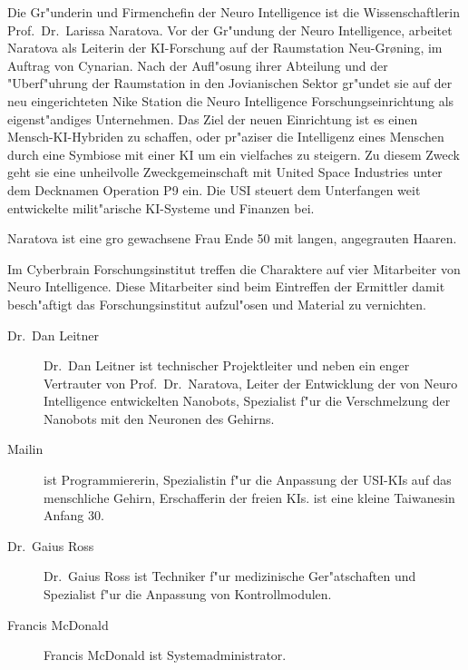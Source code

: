 \renewcommand{\ml}{\pinyin{Mailin2}}


Die Gr"underin und Firmenchefin der Neuro Intelligence ist die Wissenschaftlerin Prof.~Dr.~Larissa Naratova. Vor der Gr"undung der Neuro Intelligence, arbeitet Naratova als Leiterin der KI-Forschung auf der Raumstation Neu-Gr{\o}ning, im Auftrag von Cynarian. Nach der Aufl"osung ihrer Abteilung und der "Uberf"uhrung der Raumstation in den Jovianischen Sektor gr"undet sie auf der neu eingerichteten Nike Station die Neuro Intelligence Forschungseinrichtung als eigenst"andiges Unternehmen. Das Ziel der neuen Einrichtung ist es einen Mensch-KI-Hybriden zu schaffen, oder pr"aziser die Intelligenz eines Menschen durch eine Symbiose mit einer KI um ein vielfaches zu steigern. Zu diesem Zweck  geht sie eine unheilvolle Zweckgemeinschaft mit United Space Industries unter dem Decknamen Operation P9 ein. Die USI steuert dem Unterfangen weit entwickelte milit"arische KI-Systeme und Finanzen bei.

Naratova ist eine gro\3 gewachsene Frau Ende 50 mit langen, angegrauten Haaren. 


Im Cyberbrain Forschungsinstitut treffen die Charaktere auf vier Mitarbeiter von Neuro Intelligence. Diese Mitarbeiter sind beim Eintreffen der Ermittler damit besch"aftigt das Forschungsinstitut aufzul"osen und Material zu vernichten.

\begin{description}
    \item[Dr.~Dan Leitner] Dr.~Dan Leitner ist technischer Projektleiter und neben \ml{} ein enger Vertrauter von Prof.~Dr.~Naratova, 
        Leiter der Entwicklung der von Neuro Intelligence entwickelten Nanobots, Spezialist f"ur die Verschmelzung der Nanobots mit den Neuronen des Gehirns.
    \item[Mailin] \ml{} ist Programmiererin, Spezialistin f"ur die Anpassung der USI-KIs auf das menschliche Gehirn, Erschafferin der 
        freien KIs. \ml{} ist eine kleine Taiwanesin Anfang 30.
    \item[Dr.~Gaius Ross] Dr.~Gaius Ross ist Techniker f"ur medizinische Ger"atschaften und Spezialist f"ur die Anpassung von Kontrollmodulen.
    \item[Francis McDonald] Francis McDonald ist Systemadministrator.
\end{description}
\vfill\newpage

